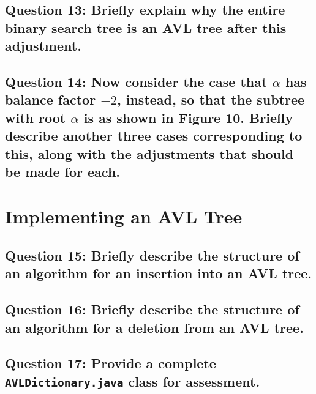 \documentclass[a4paper, 12pt, titlepage]{article}
\def\code#1{\texttt{#1}}
\begin{document}
\subsection*{Question 13: Briefly explain why the entire binary search tree is an AVL tree after this adjustment.} 

\subsection*{Question 14: Now consider the case that $\alpha$ has balance factor $-2$, instead, so that the subtree with root $\alpha$ is as shown in Figure 10. Briefly describe another three cases corresponding to this, along with the adjustments that should be made for each.} 

\section*{Implementing an AVL Tree}

\subsection*{Question 15: Briefly describe the structure of an algorithm for an insertion into an AVL tree.} 

\subsection*{Question 16: Briefly describe the structure of an algorithm for a deletion from an AVL tree.} 

\subsection*{Question 17: Provide a complete \code{AVLDictionary.java} class for assessment.} 
\end{document}
